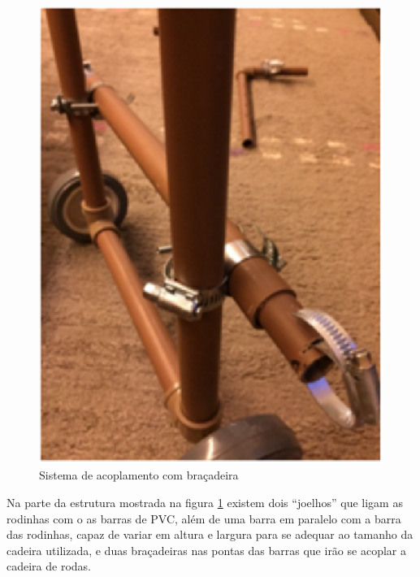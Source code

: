 \begin{figure}[!htb]
\centering
\includegraphics[keepaspectratio=true,scale=0.7]{figuras/resultados/acop_bracadeira}
\caption{Sistema de acoplamento com braçadeira}
\label{fig:acop_bracadeira}
\end{figure}

Na parte da estrutura mostrada na figura \ref{fig:acop_bracadeira} existem dois “joelhos” que ligam as rodinhas com o as barras de PVC, além de uma barra em paralelo com a barra das rodinhas, capaz de variar em altura e largura para se adequar ao tamanho da cadeira utilizada, e  duas braçadeiras nas pontas das barras que irão se acoplar a cadeira de rodas.

